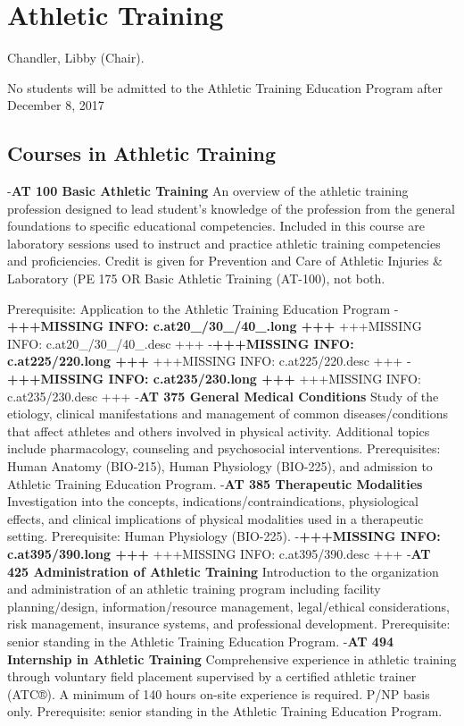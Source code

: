 \documentclass[
  letterpaper,
]{scrbook}
\begin{document}
\section{Athletic Training}\label{athletic-training}

Chandler, Libby (Chair).

No students will be admitted to the Athletic Training Education Program
after December 8, 2017

\subsection{Courses in Athletic
Training}\label{courses-in-athletic-training}

-\textbf{AT 100 Basic Athletic Training} An overview of the athletic
training profession designed to lead student's knowledge of the
profession from the general foundations to specific educational
competencies. Included in this course are laboratory sessions used to
instruct and practice athletic training competencies and proficiencies.
Credit is given for Prevention and Care of Athletic Injuries \&
Laboratory (PE 175 OR Basic Athletic Training (AT-100), not both.

Prerequisite: Application to the Athletic Training Education Program
-\textbf{+++MISSING INFO: c.at20\_/30\_/40\_.long +++} +++MISSING INFO:
c.at20\_/30\_/40\_.desc +++ -\textbf{+++MISSING INFO: c.at225/220.long
+++} +++MISSING INFO: c.at225/220.desc +++ -\textbf{+++MISSING INFO:
c.at235/230.long +++} +++MISSING INFO: c.at235/230.desc +++ -\textbf{AT
375 General Medical Conditions} Study of the etiology, clinical
manifestations and management of common diseases/conditions that affect
athletes and others involved in physical activity. Additional topics
include pharmacology, counseling and psychosocial interventions.
Prerequisites: Human Anatomy (BIO-215), Human Physiology (BIO-225), and
admission to Athletic Training Education Program. -\textbf{AT 385
Therapeutic Modalities} Investigation into the concepts,
indications/contraindications, physiological effects, and clinical
implications of physical modalities used in a therapeutic setting.
Prerequisite: Human Physiology (BIO-225). -\textbf{+++MISSING INFO:
c.at395/390.long +++} +++MISSING INFO: c.at395/390.desc +++ -\textbf{AT
425 Administration of Athletic Training} Introduction to the
organization and administration of an athletic training program
including facility planning/design, information/resource management,
legal/ethical considerations, risk management, insurance systems, and
professional development. Prerequisite: senior standing in the Athletic
Training Education Program. -\textbf{AT 494 Internship in Athletic
Training} Comprehensive experience in athletic training through
voluntary field placement supervised by a certified athletic trainer
(ATC®). A minimum of 140 hours on-site experience is required. P/NP
basis only. Prerequisite: senior standing in the Athletic Training
Education Program.
\end{document}
